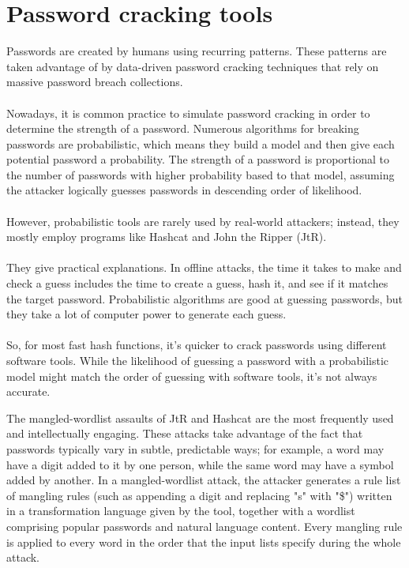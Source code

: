 \documentclass[10pt,oneside,english,a4paper]{article}
\begin{document}
\clearpage
\section{Password cracking tools}
Passwords are created by humans using recurring patterns. These patterns are taken advantage of by data-driven password cracking techniques that rely on massive password breach collections. \\\\
Nowadays, it is common practice to simulate password cracking in order to determine the strength of a password. Numerous algorithms for breaking passwords are probabilistic, which means they build a model and then give each potential password a probability. The strength of a password is proportional to the number of passwords with higher probability based to that model, assuming the attacker logically guesses passwords in descending order of likelihood. \\\\
However, probabilistic tools are rarely used by real-world attackers; instead, they mostly employ programs like Hashcat and John the Ripper (JtR).\\\\ 
They give practical explanations.
In offline attacks, the time it takes to make and check a guess includes the time to create a guess, hash it, and see if it matches the target password. Probabilistic algorithms are good at guessing passwords, but they take a lot of computer power to generate each guess. \\\\
So, for most fast hash functions, it's quicker to crack passwords using different software tools. While the likelihood of guessing a password with a probabilistic model might match the order of guessing with software tools, it's not always accurate.


The mangled-wordlist assaults of JtR and Hashcat are the most frequently used and intellectually engaging. These attacks take advantage of the fact that passwords typically vary in subtle, predictable ways; for example, a word may have a digit added to it by one person, while the same word may have a symbol added by another. In a mangled-wordlist attack, the attacker generates a rule list of mangling rules (such as appending a digit and replacing "s" with "\$") written in a transformation language given by the tool, together with a wordlist comprising popular passwords and natural language content. Every mangling rule is applied to every word in the order that the input lists specify during the whole attack.
\end{document}

